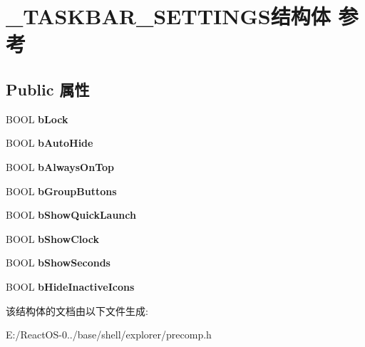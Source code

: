 \hypertarget{struct___t_a_s_k_b_a_r___s_e_t_t_i_n_g_s}{}\section{\+\_\+\+T\+A\+S\+K\+B\+A\+R\+\_\+\+S\+E\+T\+T\+I\+N\+G\+S结构体 参考}
\label{struct___t_a_s_k_b_a_r___s_e_t_t_i_n_g_s}
\subsection*{Public 属性}
\begin{DoxyCompactItemize}
\item 
\mbox{\label{struct___t_a_s_k_b_a_r___s_e_t_t_i_n_g_s_ae91a3af236c00b44ada2b5a2f1504940}} 
B\+O\+OL {\bfseries b\+Lock}
\item 
\mbox{\label{struct___t_a_s_k_b_a_r___s_e_t_t_i_n_g_s_a7e378cabad2a39c126e08503b696d9af}} 
B\+O\+OL {\bfseries b\+Auto\+Hide}
\item 
\mbox{\label{struct___t_a_s_k_b_a_r___s_e_t_t_i_n_g_s_ae92e1f9430925bf1a42e9dd580c497a2}} 
B\+O\+OL {\bfseries b\+Always\+On\+Top}
\item 
\mbox{\label{struct___t_a_s_k_b_a_r___s_e_t_t_i_n_g_s_ac89cbf0b9b4fe521168d8ad9691641bd}} 
B\+O\+OL {\bfseries b\+Group\+Buttons}
\item 
\mbox{\label{struct___t_a_s_k_b_a_r___s_e_t_t_i_n_g_s_a3e163093305bf05c32f01bd3dcdfbe2e}} 
B\+O\+OL {\bfseries b\+Show\+Quick\+Launch}
\item 
\mbox{\label{struct___t_a_s_k_b_a_r___s_e_t_t_i_n_g_s_ae34c5fad197d0526b2ef1d9272fb12d2}} 
B\+O\+OL {\bfseries b\+Show\+Clock}
\item 
\mbox{\label{struct___t_a_s_k_b_a_r___s_e_t_t_i_n_g_s_a915c3f4bcdb02087013bb4a859424751}} 
B\+O\+OL {\bfseries b\+Show\+Seconds}
\item 
\mbox{\label{struct___t_a_s_k_b_a_r___s_e_t_t_i_n_g_s_a07caf8a73f284391734828b48418ba11}} 
B\+O\+OL {\bfseries b\+Hide\+Inactive\+Icons}
\end{DoxyCompactItemize}


该结构体的文档由以下文件生成\+:\begin{DoxyCompactItemize}
\item 
E\+:/\+React\+O\+S-\/0../base/shell/explorer/precomp.\+h\end{DoxyCompactItemize}
